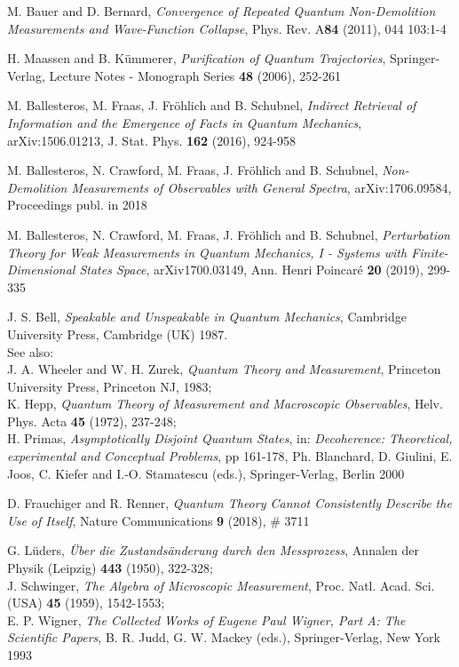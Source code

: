\documentclass[12pt]{article}
\begin{document}
\begin{thebibliography}{References}
 M. Bauer and D. Bernard, \textit{Convergence of Repeated Quantum Non-Demolition Measurements and Wave-Function Collapse}, Phys. Rev. A{\bf{84}} (2011), 044 103:1-4

 H. Maassen and B. K\"{u}mmerer, \textit{Purification of Quantum Trajectories}, Springer-Verlag, Lecture Notes - Monograph Series {\bf{48}} (2006), 252-261 

 M. Ballesteros, M. Fraas, J. Fr\"{o}hlich and B. Schubnel, \textit{Indirect Retrieval of Information and the Emergence of Facts in Quantum Mechanics}, arXiv:1506.01213, J. Stat. Phys. {\bf{162}} (2016), 924-958 

 M. Ballesteros, N. Crawford, M. Fraas, J. Fr\"{o}hlich and B. Schubnel, \textit{Non-Demolition Measurements of Observables with General Spectra}, arXiv:1706.09584, Proceedings publ. in 2018

 M. Ballesteros, N. Crawford, M. Fraas, J. Fr\"{o}hlich and B. Schubnel, \textit{Perturbation Theory for Weak Measurements in Quantum Mechanics, I - Systems with Finite-Dimensional States Space}, arXiv1700.03149, Ann. Henri Poincar\'e {\bf{20}} (2019), 299-335 

 J. S. Bell, \textit{Speakable and Unspeakable in Quantum Mechanics}, Cambridge University Press, Cambridge (UK) 1987.\\
See also:\\
J. A. Wheeler and W. H. Zurek, \textit{Quantum Theory and Measurement}, Princeton University Press, Princeton NJ, 1983;\\
K. Hepp, \textit{Quantum Theory of Measurement and Macroscopic Observables}, Helv. Phys. Acta {\bf{45}} (1972), 237-248;\\
H. Primas, \textit{Asymptotically Disjoint Quantum States}, in: \textit{Decoherence: Theoretical, experimental and Conceptual Problems}, pp 161-178, Ph. Blanchard, D. Giulini, E. Joos, C. Kiefer and I.-O. Stamatescu (eds.), Springer-Verlag, Berlin 2000

 D. Frauchiger and R. Renner, \textit{Quantum Theory Cannot Consistently Describe the Use of Itself}, Nature Communications {\bf{9}} (2018), \# 3711 

 G. L\"{u}ders, \textit{\"{U}ber die Zustands\"{a}nderung durch den Messprozess}, Annalen der Physik (Leipzig) {\bf{443}} (1950), 322-328;\\
J. Schwinger, \textit{The Algebra of Microscopic Measurement}, Proc. Natl. Acad. Sci. (USA) {\bf{45}} (1959), 1542-1553;\\
E. P. Wigner, \textit{The Collected Works of Eugene Paul Wigner, Part A: The Scientific Papers}, B. R. Judd, G. W. Mackey (eds.), Springer-Verlag, New York 1993


\end{thebibliography}
\end{document}
